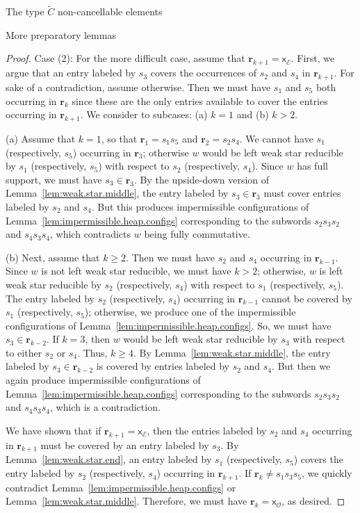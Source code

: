\documentclass[12pt]{amsart}
\newcommand{\C}{\widetilde{C}}
\renewcommand{\O}{\mathcal{O}}
\newcommand{\E}{\mathcal{E}}
\newcommand{\x}{\mathsf{x}}
\renewcommand{\(}{\left(}
\renewcommand{\)}{\right)}
\renewcommand{\r}{\mathbf{r}}
\begin{document}
\begin{section}{The type $\C$ non-cancellable elements}
\begin{subsection}{More preparatory lemmas}
\begin{proof}
Case (2):  For the more difficult case, assume that $\r_{k+1}=\x_{\E}$.  First, we argue that an entry labeled by $s_{3}$ covers the occurrences of $s_{2}$ and $s_{4}$ in $\r_{k+1}$.  For sake of a contradiction, assume otherwise.  Then we must have $s_{1}$ and $s_{5}$ both occurring in $\r_{k}$ since these are the only entries available to cover the entries occurring in $\r_{k+1}$.  We consider to subcases: (a) $k=1$ and (b) $k>2$.  

(a) Assume that $k=1$, so that $\r_{1}=s_{1}s_{5}$ and $\r_{2}=s_{2}s_{4}$.  We cannot have $s_{1}$ (respectively, $s_{5}$) occurring in $\r_{3}$; otherwise $w$ would be left weak star reducible by $s_{1}$ (respectively, $s_{5}$) with respect to $s_{2}$ (respectively, $s_{4}$).  Since $w$ has full support, we must have $s_{3} \in \r_{3}$.  By the upside-down version of  Lemma~\ref{lem:weak.star.middle}, the entry labeled by $s_{3} \in \r_{3}$ must cover entries labeled by $s_{2}$ and $s_{4}$.  But this produces impermissible configurations of Lemma~\ref{lem:impermissible.heap.configs} corresponding to the subwords $s_{2}s_{3}s_{2}$ and $s_{4}s_{3}s_{4}$, which contradicts $w$ being fully commutative.  

(b) Next, assume that $k\geq 2$.  Then we must have $s_{2}$ and $s_{4}$ occurring in $\r_{k-1}$.  Since $w$ is not left weak star reducible, we must have $k > 2$; otherwise, $w$ is left weak star reducible by $s_{2}$ (respectively, $s_{4}$) with respect to $s_{1}$ (respectively, $s_{5}$).  The entry labeled by $s_{2}$ (respectively, $s_{4}$) occurring in $\r_{k-1}$ cannot be covered by $s_{1}$ (respectively, $s_{5}$); otherwise, we produce one of the impermissible configurations of Lemma~\ref{lem:impermissible.heap.configs}.  So, we must have $s_{3} \in \r_{k-2}$.  If $k=3$, then $w$ would be left weak star reducible by $s_{3}$ with respect to either $s_{2}$ or $s_{4}$.  Thus, $k \geq 4$.  By Lemma~\ref{lem:weak.star.middle}, the entry labeled by $s_{3} \in \r_{k-2}$ is covered by entries labeled by $s_{2}$ and $s_{4}$.  But then we again produce impermissible configurations of Lemma~\ref{lem:impermissible.heap.configs} corresponding to the subwords $s_{2}s_{3}s_{2}$ and $s_{4}s_{3}s_{4}$, which is a contradiction.

We have shown that if $\r_{k+1}=\x_{\E}$, then the entries labeled by $s_{2}$ and $s_{4}$ occurring in $\r_{k+1}$ must be covered by an entry labeled by $s_{3}$.  By Lemma~\ref{lem:weak.star.end}, an entry labeled by $s_{1}$ (respectively, $s_{5}$) covers the entry labeled by $s_{2}$ (respectively, $s_{4}$) occurring in $\r_{k+1}$.   If $\r_{k} \neq s_{1}s_{3}s_{5}$, we quickly contradict Lemma~\ref{lem:impermissible.heap.configs} or Lemma~\ref{lem:weak.star.middle}.  Therefore, we must have $\r_{k}=\x_{\O}$, as desired.
\end{proof}


\end{subsection}
\end{section}
\end{document}
